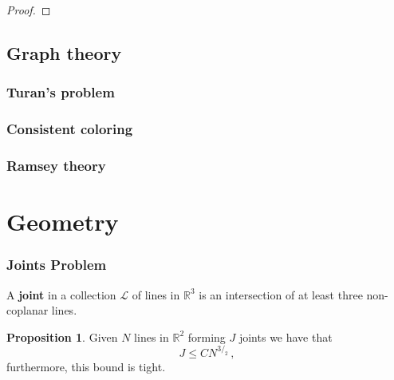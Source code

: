 \documentclass[12pt]{amsart}
\theoremstyle{definition}
\newtheorem{prop}[thm]{Proposition}
\newcommand{\R}{\mathbb{R}}
\begin{document}
\begin{proof}
\end{proof}

\subsection{Graph theory}

\subsubsection{Turan's problem}

\subsubsection{Consistent coloring}

\subsubsection{Ramsey theory}

\section{Geometry}

\subsubsection*{Joints Problem}




A \textbf{joint} in a collection $\mathcal L$ of lines in $\R^3$ is an intersection of at least three non-coplanar lines.


\begin{prop}
Given $N$ lines in $\R^2$ forming $J$ joints we have that
$$ J \leq C N^{3/_2}\, ,$$
furthermore, this bound is tight.
\end{prop}
\end{document}
